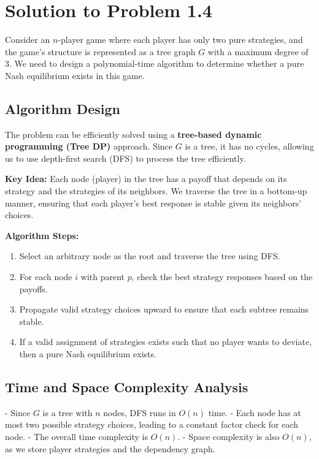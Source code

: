 \documentclass{article}
\begin{document}
\section*{Solution to Problem 1.4}

Consider an $n$-player game where each player has only two pure strategies, and the game's structure is represented as a tree graph $G$ with a maximum degree of 3. We need to design a polynomial-time algorithm to determine whether a pure Nash equilibrium exists in this game.

\subsection*{Algorithm Design}

The problem can be efficiently solved using a \textbf{tree-based dynamic programming (Tree DP)} approach. Since $G$ is a tree, it has no cycles, allowing us to use depth-first search (DFS) to process the tree efficiently.

\textbf{Key Idea:} Each node (player) in the tree has a payoff that depends on its strategy and the strategies of its neighbors. We traverse the tree in a bottom-up manner, ensuring that each player's best response is stable given its neighbors' choices.

\textbf{Algorithm Steps:}
\begin{enumerate}
    \item Select an arbitrary node as the root and traverse the tree using DFS.
    \item For each node $i$ with parent $p$, check the best strategy responses based on the payoffs.
    \item Propagate valid strategy choices upward to ensure that each subtree remains stable.
    \item If a valid assignment of strategies exists such that no player wants to deviate, then a pure Nash equilibrium exists.
\end{enumerate}

\subsection*{Time and Space Complexity Analysis}
- Since $G$ is a tree with $n$ nodes, DFS runs in $O(n)$ time.
- Each node has at most two possible strategy choices, leading to a constant factor check for each node.
- The overall time complexity is $O(n)$.
- Space complexity is also $O(n)$, as we store player strategies and the dependency graph.
\end{document}
